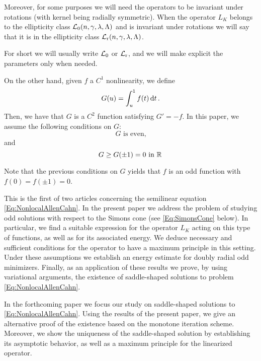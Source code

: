 Moreover, for some purposes we will need the operators to be invariant under rotations (with kernel being radially symmetric). When the operator $L_K$ belongs to the ellipticity class $\mathcal{L}_0(n,\gamma,\lambda, \Lambda)$ and is invariant under rotations we will say that it is in the ellipticity class $\mathcal{L}_{\mathrm{r}}(n,\gamma,\lambda, \Lambda)$.


For short we will usually write $\mathcal{L}_0$ or $\mathcal{L}_{\mathrm{r}}$, and we will make explicit the parameters only when needed.

On the other hand, given $f$ a $C^1$ nonlinearity, we define
$$
G(u)= \int_u^1 f(t) \,\mathrm{d} t\,.
$$
Then, we have that $G$ is a $C^2$ function satisfying $G' = -f$. In this paper, we assume the following conditions on $G$:
\begin{equation}
\label{Eq:HipothesisfOdd}
G \textrm{ is even,}
\end{equation}
and
\begin{equation}
\label{Eq:HipothesisGWells}
G\geq G(\pm 1 )=0 \textrm{ in } \mathbb{R}\,
\end{equation}

Note that the previous conditions on $G$ yields that $f$ is an odd function with $f(0)=f(\pm 1)=0$.



This is the first of two articles concerning the semilinear equation \eqref{Eq:NonlocalAllenCahn}. In the present paper we address the problem of studying odd solutions with respect to the Simons cone (see \eqref{Eq:SimonsCone} below). In particular, we find a suitable expression for the operator $L_K$  acting on this type of functions, as well as for its associated energy. We deduce necessary and sufficient conditions for the operator to have a maximum principle in this setting. Under these assumptions we establish an energy estimate for doubly radial odd minimizers. Finally, as an application of these results we prove, by using variational arguments, the existence of saddle-shaped solutions to problem \eqref{Eq:NonlocalAllenCahn}.

In the forthcoming paper \cite{FelipeSanz-Perela:IntegroDifferentialII} we focus our study on saddle-shaped solutions to \eqref{Eq:NonlocalAllenCahn}. Using the results of the present paper, we give an alternative proof of the existence based on the monotone iteration scheme. Moreover, we show the uniqueness of the saddle-shaped solution by establishing its asymptotic behavior, as well as a maximum principle for the linearized operator.



